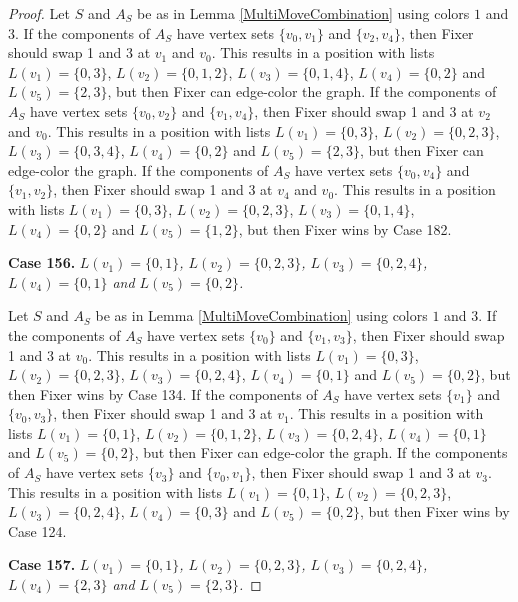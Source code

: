 \documentclass[12pt]{amsart}
\theoremstyle{plain}
\theoremstyle{definition}
\theoremstyle{remark}
\begin{document}
\begin{proof}
Let $S$ and $A_S$ be as in Lemma \ref{MultiMoveCombination} using colors $1$ and $3$. If the components of $A_S$ have vertex sets $\{v_0, v_1\}$ and $\{v_2, v_4\}$, then Fixer should swap 1 and 3 at $v_1$ and $v_0$. This results in a position with lists $L(v_1) = \{0, 3\}$, $L(v_2) = \{0, 1, 2\}$, $L(v_3) = \{0, 1, 4\}$, $L(v_4) = \{0, 2\}$ and $L(v_5) = \{2, 3\}$, but then Fixer can edge-color the graph.
If the components of $A_S$ have vertex sets $\{v_0, v_2\}$ and $\{v_1, v_4\}$, then Fixer should swap 1 and 3 at $v_2$ and $v_0$. This results in a position with lists $L(v_1) = \{0, 3\}$, $L(v_2) = \{0, 2, 3\}$, $L(v_3) = \{0, 3, 4\}$, $L(v_4) = \{0, 2\}$ and $L(v_5) = \{2, 3\}$, but then Fixer can edge-color the graph.
If the components of $A_S$ have vertex sets $\{v_0, v_4\}$ and $\{v_1, v_2\}$, then Fixer should swap 1 and 3 at $v_4$ and $v_0$. This results in a position with lists $L(v_1) = \{0, 3\}$, $L(v_2) = \{0, 2, 3\}$, $L(v_3) = \{0, 1, 4\}$, $L(v_4) = \{0, 2\}$ and $L(v_5) = \{1, 2\}$, but then Fixer wins by Case 182.

\noindent\textbf{Case 156.  }\textit{$L(v_1) = \{0, 1\}$, $L(v_2) = \{0, 2, 3\}$, $L(v_3) = \{0, 2, 4\}$, $L(v_4) = \{0, 1\}$ and $L(v_5) = \{0, 2\}$.}

Let $S$ and $A_S$ be as in Lemma \ref{MultiMoveCombination} using colors $1$ and $3$. If the components of $A_S$ have vertex sets $\{v_0\}$ and $\{v_1, v_3\}$, then Fixer should swap 1 and 3 at $v_0$. This results in a position with lists $L(v_1) = \{0, 3\}$, $L(v_2) = \{0, 2, 3\}$, $L(v_3) = \{0, 2, 4\}$, $L(v_4) = \{0, 1\}$ and $L(v_5) = \{0, 2\}$, but then Fixer wins by Case 134.
If the components of $A_S$ have vertex sets $\{v_1\}$ and $\{v_0, v_3\}$, then Fixer should swap 1 and 3 at $v_1$. This results in a position with lists $L(v_1) = \{0, 1\}$, $L(v_2) = \{0, 1, 2\}$, $L(v_3) = \{0, 2, 4\}$, $L(v_4) = \{0, 1\}$ and $L(v_5) = \{0, 2\}$, but then Fixer can edge-color the graph.
If the components of $A_S$ have vertex sets $\{v_3\}$ and $\{v_0, v_1\}$, then Fixer should swap 1 and 3 at $v_3$. This results in a position with lists $L(v_1) = \{0, 1\}$, $L(v_2) = \{0, 2, 3\}$, $L(v_3) = \{0, 2, 4\}$, $L(v_4) = \{0, 3\}$ and $L(v_5) = \{0, 2\}$, but then Fixer wins by Case 124.

\noindent\textbf{Case 157.  }\textit{$L(v_1) = \{0, 1\}$, $L(v_2) = \{0, 2, 3\}$, $L(v_3) = \{0, 2, 4\}$, $L(v_4) = \{2, 3\}$ and $L(v_5) = \{2, 3\}$.}


\end{proof}
\end{document}
